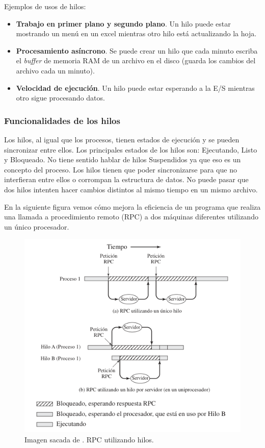 \documentclass[12pt]{article}
\begin{document}
  Ejemplos de usos de hilos:
  \begin{itemize}
    \item \textbf{Trabajo en primer plano y segundo plano}. Un hilo puede estar mostrando un menú en un excel mientras otro hilo está actualizando la hoja.

    \item \textbf{Procesamiento asíncrono}. Se puede crear un hilo que cada minuto escriba el \textit{buffer} de memoria RAM de un archivo en el disco (guarda los cambios del archivo cada un minuto).

    \item \textbf{Velocidad de ejecución}. Un hilo puede estar esperando a la E/S mientras otro sigue procesando datos.
  \end{itemize}

  \subsubsection{Funcionalidades de los hilos}
  Los hilos, al igual que los procesos, tienen estados de ejecución y se pueden sincronizar entre ellos. Los principales estados de los hilos son: Ejecutando, Listo y Bloqueado. No tiene sentido hablar de hilos Suspendidos ya que eso es un concepto del proceso. Los hilos tienen que poder sincronizarse para que no interfieran entre ellos o corrompan la estructura de datos. No puede pasar que dos hilos intenten hacer cambios distintos al mismo tiempo en un mismo archivo.

  En la siguiente figura vemos cómo mejora la eficiencia de un programa que realiza una llamada a procedimiento remoto (RPC) a dos máquinas diferentes utilizando un único procesador.

  \begin{figure}[H]
    \centering
    \includegraphics[width=0.7\linewidth]{imagenes/mono-vs-multihilo-2.png}
    \caption{Imagen sacada de \parencite{sostallings}. RPC utilizando hilos.}
    \label{fig:mono-vs-mulithilo-2}
  \end{figure}
\end{document}
